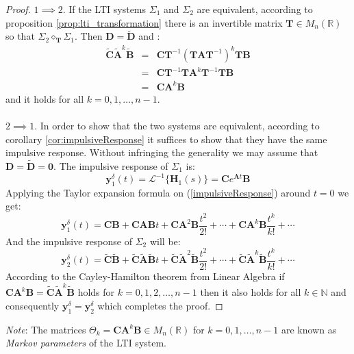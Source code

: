\documentclass[a4paper,10pt,oneside]{book}
\begin{document}
\begin{proof}
 $1 \implies 2$. If the LTI systems $\Sigma_1$ and $\Sigma_2$ are equivalent, according to proposition \ref{prop:lti_transformation} there is an invertible matrix $\mathbf{T}\in M_n(\mathbb{R})$ so that $\Sigma_2 \diamond_{\mathbf{T}} \Sigma_1$. Then $\mathbf{D}=\tilde{\mathbf{D}}$ and :
\begin{eqnarray}
 \tilde{\mathbf{C}}\tilde{\mathbf{A}}^k\tilde{\mathbf{B}}&=&\mathbf{CT}^{-1}(\mathbf{TAT}^{-1})^k\mathbf{TB}\\
  &=& \mathbf{CT}^{-1}\mathbf{TA}^k\mathbf{T}^{-1}\mathbf{TB}\\
  &=& \mathbf{CA}^k\mathbf{B}
\end{eqnarray}
and it holds for all $k=0,1,\ldots,n-1$.\\
\\
$2 \implies 1$. In order to show that the two systems are equivalent, according to corollary \ref{cor:impulsiveResponse} it suffices to show that they have the same impulsive response. Without infringing the generality we may assume that $\mathbf{D}=\tilde{\mathbf{D}}=\mathbf{0}$. The impulsive response of $\Sigma_1$ is:
\begin{equation}
 \mathbf{y}_1^{\delta}(t)=\mathcal{L}^{-1}\{\mathbf{H}_1(s)\}=\mathbf{C}e^{\mathbf{A}t}\mathbf{B} \label{impulsiveResponse}
\end{equation}
Applying the Taylor expansion formula on (\ref{impulsiveResponse}) around $t=0$ we get:
\begin{equation}
 \mathbf{y}_{1}^{\delta}(t)=\mathbf{CB}+\mathbf{CAB}t+\mathbf{CA}^2\mathbf{B}\frac{t^2}{2!}+\cdots+\mathbf{CA}^k\mathbf{B}\frac{t^k}{k!}+\cdots
\end{equation}
And the impulsive response of $\Sigma_2$ will be:
\begin{equation}
 \mathbf{y}_{2}^{\delta}(t)=\tilde{\mathbf{C}}\tilde{\mathbf{B}}+\tilde{\mathbf{C}}\tilde{\mathbf{A}}\tilde{\mathbf{B}}t+\tilde{\mathbf{C}}\tilde{\mathbf{A}}^2\tilde{\mathbf{B}}\frac{t^2}{2!}+\cdots+\tilde{\mathbf{C}}\tilde{\mathbf{A}}^k\tilde{\mathbf{B}}\frac{t^k}{k!}+\cdots
\end{equation}
According to the Cayley-Hamilton theorem from Linear Algebra if $\mathbf{CA}^k\mathbf{B}=\tilde{\mathbf{C}}\tilde{\mathbf{A}}^k\tilde{\mathbf{B}}$ holds for $k=0,1,2,\ldots,n-1$ then it also holds for all $k\in\mathbb{N}$ and consequently $\mathbf{y}_1^{\delta}=\mathbf{y}_2^{\delta}$ which completes the proof.
\end{proof}
\noindent \emph{Note}: The matrices $\Theta_k=\mathbf{CA}^k\mathbf{B}\in M_n(\mathbb{R})$ for $k=0,1,\ldots,n-1$ are known as \emph{Markov parameters} of the LTI system.
\end{document}

